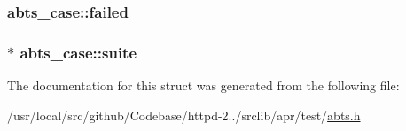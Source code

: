 \subsubsection[{\texorpdfstring{failed}{failed}}]{ abts\+\_\+case\+::failed}\hypertarget{structabts__case_a632ebd793060b90c61b2c3599638d405}{}\label{structabts__case_a632ebd793060b90c61b2c3599638d405}
\subsubsection[{\texorpdfstring{suite}{suite}}]{ $\ast$ abts\+\_\+case\+::suite}\hypertarget{structabts__case_aefa5e913449f9ba0cb041e9fe088561b}{}\label{structabts__case_aefa5e913449f9ba0cb041e9fe088561b}


The documentation for this struct was generated from the following file\+:\begin{DoxyCompactItemize}
\item 
/usr/local/src/github/\+Codebase/httpd-\/2../srclib/apr/test/\hyperlink{test_2abts_8h}{abts.\+h}\end{DoxyCompactItemize}
